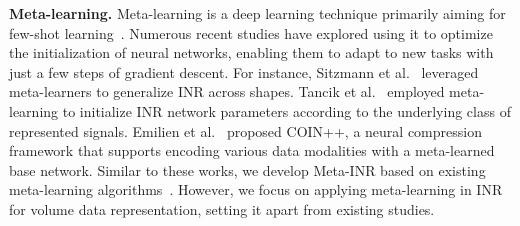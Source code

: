 {\bf Meta-learning.}
Meta-learning is a deep learning technique primarily aiming for few-shot learning~\cite{Song-ACM23}.
Numerous recent studies have explored using it to optimize the initialization of neural networks, enabling them to adapt to new tasks with just a few steps of gradient descent.
For instance, 
Sitzmann et al.\ \cite{Sitzmann-MetaSDF-NeurIPS20} leveraged meta-learners to generalize INR across shapes.
Tancik et al.\ \cite{Tancik-CVPR21} employed meta-learning to initialize INR network parameters according to the underlying class of represented signals.
Emilien et al.\ \cite{Emilien-TMLR} proposed COIN++, a neural compression framework that supports encoding various data modalities with a meta-learned base network.
Similar to these works, we develop Meta-INR based on existing meta-learning algorithms~\cite{Finn-ICML17, Nichol-arXiv18}.
However, we focus on applying meta-learning in INR for volume data representation, setting it apart from existing studies.